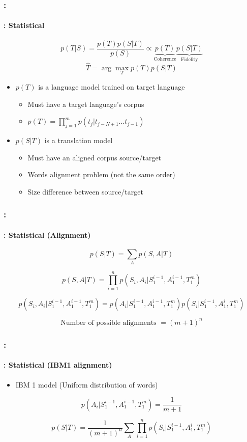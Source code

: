 \documentclass[xcolor=table]{beamer}
\begin{document}
\begin{frame}
	\frametitle{\insertshortsubtitle: \insertsection}
	\framesubtitle{\insertsubsection: Statistical}
	\[
	p(T|S) = \frac{p(T) p(S|T)}{p(S)} \propto \underbrace{p(T)}_\text{Coherence} \underbrace{p(S|T)}_\text{Fidelity}
	\]
	\[\hat{T} = \arg\max_{T} p(T) p(S|T)\]
	\[\]
	\begin{itemize}
		\item $p(T)$ is a language model trained on target language
		\begin{itemize}
			\item Must have a target language's corpus
			\item $p(T) = \prod_{j=1}^m p(t_j|t_{j-N+1}\ldots t_{j-1})$
		\end{itemize}
		
		\item $p(S|T)$ is a translation model 
		\begin{itemize}
			\item Must have an aligned corpus source/target
			\item Words alignment problem (not the same order)
			\item Size difference between source/target
		\end{itemize}
	\end{itemize}

\end{frame}

\begin{frame}
	\frametitle{\insertshortsubtitle: \insertsection}
	\framesubtitle{\insertsubsection: Statistical (Alignment)}
	
	\[p(S|T) = \sum_{A} p(S, A | T)\]
	
	\[p(S, A | T) = \prod_{i=1}^{n} p(S_i, A_i | S_1^{i-1}, A_1^{i-1}, T_1^{m})\]
	
	\[p(S_i, A_i | S_1^{i-1}, A_1^{i-1}, T_1^{m}) = p(A_i | S_1^{i-1}, A_1^{i-1}, T_1^{m}) p(S_i | S_1^{i-1}, A_1^{i}, T_1^{m})\]
	
	\[ \text{Number of possible alignments } = (m + 1)^n\]
	
\end{frame}

\begin{frame}
	\frametitle{\insertshortsubtitle: \insertsection}
	\framesubtitle{\insertsubsection: Statistical (IBM1 alignment)}
	
	\begin{itemize}
		\item IBM 1 model (Uniform distribution of words)
	\end{itemize}

	\[p(A_i | S_1^{i-1}, A_1^{i-1}, T_1^{m}) = \frac{1}{m+1}\]
	
	\[p(S|T) = \frac{1}{(m+1)^n} \sum_{A} \prod_{i=1}^{n} p(S_i | S_1^{i-1}, A_1^{i}, T_1^{m})\]
	
\end{frame}
\end{document}
